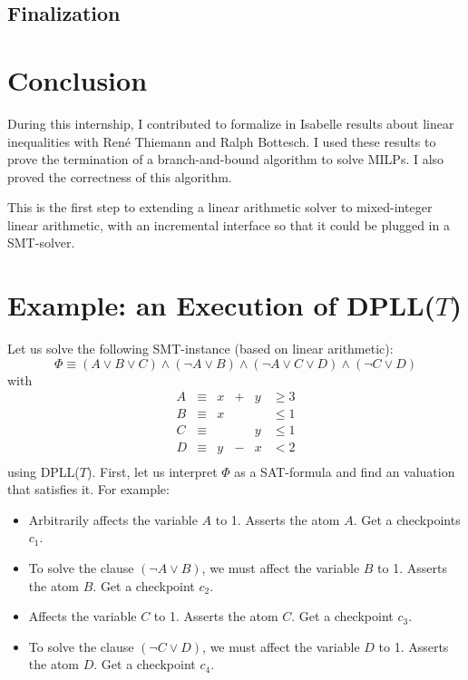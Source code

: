 \documentclass{article}
\begin{document}

\subsection{Finalization}

\section*{Conclusion}
During this internship, I contributed to formalize in Isabelle results about
linear inequalities with René Thiemann and Ralph Bottesch. I used these results
to prove the termination of a branch-and-bound algorithm to solve MILPs. I also
proved the correctness of this algorithm.

This is the first step to extending a linear arithmetic solver to mixed-integer
linear arithmetic, with an incremental interface so that it could be plugged in
a SMT-solver.




\appendix

\section{Example: an Execution of DPLL($T$)}
\label{dpll}
Let us solve the following SMT-instance (based on linear arithmetic):
$$\Phi \equiv (A \vee B \vee C) \wedge (\neg A \vee B) \wedge
              (\neg A \vee C \vee D) \wedge (\neg C \vee D)$$
with
\begin{displaymath}
\begin{array}{lccccl}
  A & \equiv & x & + & y & \geqslant 3 \\
  B & \equiv & x &   &   & \leqslant 1 \\
  C & \equiv &   &   & y & \leqslant 1 \\
  D & \equiv & y & - & x & < 2         \\
\end{array}
\end{displaymath}
using DPLL($T$). First, let us interpret $\Phi$ as a SAT-formula and find an
valuation that satisfies it. For example:
\begin{itemize}
  \item Arbitrarily affects the variable $A$ to 1. Asserts the atom $A$. Get a
    checkpoints $c_1$.
  \item To solve the clause $(\neg A \vee B)$, we must affect the variable $B$
    to 1. Asserts the atom $B$. Get a checkpoint $c_2$.
  \item Affects the variable $C$ to 1. Asserts the atom $C$. Get a checkpoint
    $c_3$.
  \item To solve the clause $(\neg C \vee D)$, we must affect the variable $D$
    to 1. Asserts the atom $D$. Get a checkpoint $c_4$.
\end{itemize}
\end{document}
